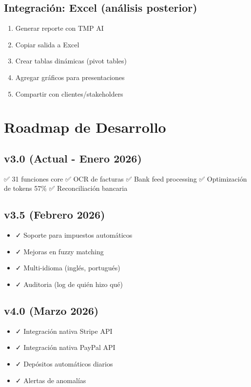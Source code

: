 \documentclass[12pt,oneside]{article}
\begin{document}
\subsection{Integración: Excel (análisis posterior)}

\begin{enumerate}
    \item Generar reporte con TMP AI
    \item Copiar salida a Excel
    \item Crear tablas dinámicas (pivot tables)
    \item Agregar gráficos para presentaciones
    \item Compartir con clientes/stakeholders
\end{enumerate}

\newpage

\section{Roadmap de Desarrollo}

\subsection{v3.0 (Actual - Enero 2026)}

✅ 31 funciones core
✅ OCR de facturas
✅ Bank feed processing
✅ Optimización de tokens 57\%
✅ Reconciliación bancaria

\subsection{v3.5 (Febrero 2026)}

\begin{itemize}
    \item ✓ Soporte para impuestos automáticos
    \item ✓ Mejoras en fuzzy matching
    \item ✓ Multi-idioma (inglés, portugués)
    \item ✓ Auditoria (log de quién hizo qué)
\end{itemize}

\subsection{v4.0 (Marzo 2026)}

\begin{itemize}
    \item ✓ Integración nativa Stripe API
    \item ✓ Integración nativa PayPal API
    \item ✓ Depósitos automáticos diarios
    \item ✓ Alertas de anomalías
\end{itemize}
\end{document}
